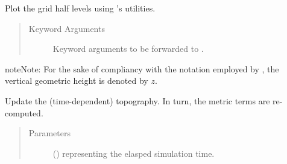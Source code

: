 \documentclass[letterpaper,10pt,english]{sphinxmanual}
\begin{document}
\begin{fulllineitems}
\begin{fulllineitems}
\end{fulllineitems}


\begin{fulllineitems}
\label{\detokenize{api:grids.sleve.SLEVE2d.plot}}
Plot the grid half levels using ’s utilities.
\begin{quote}\begin{description}
\item[{Keyword Arguments}] \leavevmode
{} \textendash{} Keyword arguments to be forwarded to .

\end{description}\end{quote}

\begin{sphinxadmonition}{note}{Note:}
For the sake of compliancy with the notation employed by ,
the vertical geometric height is denoted by \(z\).
\end{sphinxadmonition}

\end{fulllineitems}


\begin{fulllineitems}
\label{\detokenize{api:grids.sleve.SLEVE2d.update_topography}}
Update the (time-dependent) topography. In turn, the metric terms are re-computed.
\begin{quote}\begin{description}
\item[{Parameters}] \leavevmode
{} () \textendash{}  representing the elasped simulation time.

\end{description}\end{quote}

\end{fulllineitems}


\end{fulllineitems}
\end{document}
